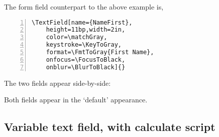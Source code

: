 \documentclass{article}
\begin{document}
The  form field counterpart to the above example is,
\begin{Verbatim}[xleftmargin=\parindent,commandchars=!(),numbers=left,numbersep=3bp,fontsize=\small]
\TextField[name={NameFirst},
    height=11bp,width=2in,
    color=\matchGray,
    keystroke=\KeyToGray,
    format=\FmtToGray{First Name},
    onfocus=\FocusToBlack,
    onblur=\BlurToBlack]{}
\end{Verbatim}
The two fields appear side-by-side:
\begin{quote}
\cgBdry[0.5em]
\TextField[name={NameFirst3},
    height=11bp,width=2in,
    color=\matchGray,
    keystroke=\KeyToGray,
    format=\FmtToGray{First Name},
    onfocus=\FocusToBlack,
    onblur=\BlurToBlack]{}\cgBdry[0.5em]
\end{quote}
Both fields appear in the `default' appearance.


\subsection{Variable text field, with calculate script}
\end{document}
